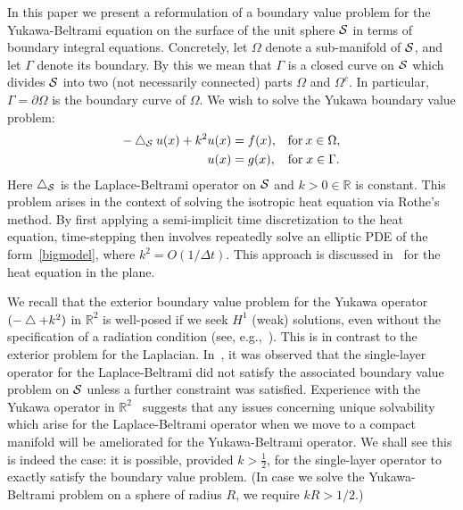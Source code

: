 In this paper we present a reformulation of a boundary value problem
for the Yukawa-Beltrami equation on the surface of the unit sphere
$\S$  in terms of boundary integral equations. Concretely, let $\Omega$
denote a sub-manifold of $\S$, and let $\Gamma$ denote its boundary. By
this we mean that $\Gamma$ is a closed curve  on $\S$ which divides
$\S$ into two (not necessarily connected) parts $\Omega$ and
$\Omega^{c}$. In particular, $\Gamma = \partial\Omega$ is the boundary
curve of $\Omega$. We wish to solve the Yukawa boundary value problem:
\begin{subequations}
\label{bigmodel}
  \begin{align}
    -\lap_\S u(x)+k^2  u(x)&= f({ x}), && \mbox{for} \: x \in \Omega, \\
    u(x)&=g(x), &&\mbox{for} \; x \in \Gamma. 
  \end{align}
\end{subequations}
Here $\lap_{\S}$ is the Laplace-Beltrami operator on $\S$ and $k>0 \in
\mathbb{R}$ is constant. This  problem arises in the context of solving
the isotropic heat equation via Rothe's method. By first applying a
semi-implicit time discretization to the heat equation,  time-stepping
then involves repeatedly solve an elliptic PDE of the
form~\eqref{bigmodel}, where $k^2 = O(1/\Delta t)$.  This approach is
discussed in~\cite{rothe:heat} for the heat equation in the plane. 

We recall that the exterior boundary value problem for the Yukawa
operator $(-\lap + k^2)$  in $\mathbb{R}^2$ is well-posed if we seek
$H^1$ (weak) solutions, even without the specification of a radiation
condition (see, e.g.,~\cite{gatica}). This is in contrast to the
exterior problem for the Laplacian.  In~\cite{gemmrich}, it was observed
that the single-layer operator for the Laplace-Beltrami did not satisfy
the associated boundary value problem on $\S$ unless a further
constraint was satisfied. Experience with the Yukawa operator in
$\mathbb{R}^2$~\cite{kro:qua2011,qua2011} suggests that any issues
concerning unique solvability which arise for the Laplace-Beltrami
operator when we move to a compact manifold will be ameliorated for the
Yukawa-Beltrami operator.  We shall see this is indeed the case: it is
possible, provided $k>\frac{1}{2}$, for the single-layer operator to
exactly satisfy the boundary value problem. (In case we solve the
Yukawa-Beltrami problem on a sphere of radius $R$, we require $kR>1/2$.)

